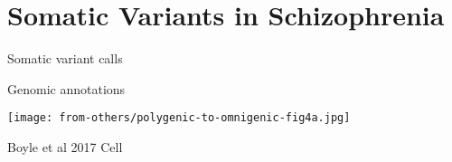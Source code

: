 \documentclass[usenames,dvipsnames]{beamer}
\begin{document}
\section{Somatic Variants in Schizophrenia}

\begin{frame}{Somatic variant calls}

\end{frame}

\begin{frame}{Genomic annotations}

\end{frame}

\begin{frame}
\texttt{[image: from-others/polygenic-to-omnigenic-fig4a.jpg]}

{\tiny Boyle et al 2017 Cell}
\end{frame}
\end{document}
